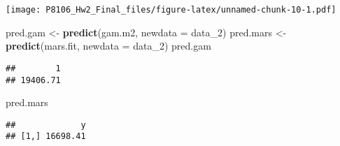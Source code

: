 \documentclass[]{article}
\newenvironment{Shaded}{\begin{snugshade}}{\end{snugshade}}
\newcommand{\DataTypeTok}[1]{\textcolor[rgb]{0.13,0.29,0.53}{#1}}
\newcommand{\DecValTok}[1]{\textcolor[rgb]{0.00,0.00,0.81}{#1}}
\newcommand{\KeywordTok}[1]{\textcolor[rgb]{0.13,0.29,0.53}{\textbf{#1}}}
\newcommand{\NormalTok}[1]{#1}
\newcommand{\StringTok}[1]{\textcolor[rgb]{0.31,0.60,0.02}{#1}}
\begin{document}
\texttt{[image: P8106\_Hw2\_Final\_files/figure-latex/unnamed-chunk-10-1.pdf]}

\begin{Shaded}
\begin{Highlighting}[]
\NormalTok{pred.gam <-}\StringTok{ }\KeywordTok{predict}\NormalTok{(gam.m2, }\DataTypeTok{newdata =}\NormalTok{ data_}\DecValTok{2}\NormalTok{)}
\NormalTok{pred.mars <-}\StringTok{ }\KeywordTok{predict}\NormalTok{(mars.fit, }\DataTypeTok{newdata =}\NormalTok{ data_}\DecValTok{2}\NormalTok{)}
\NormalTok{pred.gam}
\end{Highlighting}
\end{Shaded}

\begin{verbatim}
##        1 
## 19406.71
\end{verbatim}

\begin{Shaded}
\begin{Highlighting}[]
\NormalTok{pred.mars}
\end{Highlighting}
\end{Shaded}

\begin{verbatim}
##             y
## [1,] 16698.41
\end{verbatim}
\end{document}
